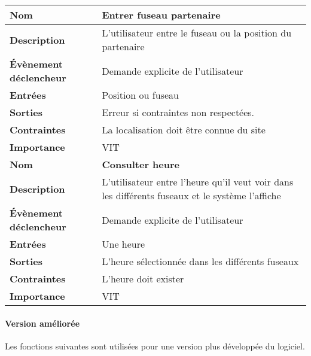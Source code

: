 \documentclass[majeure,gl]{tb}
\begin{document}
 \begin{table}[ht]
  \centering
  \begin{tabular}[c]{|p{3cm}|p{13cm}|}

\hline
 \textbf{Nom} &
 \textbf{Entrer fuseau partenaire}
 \\\hline
 \textbf{Description} &
 L'utilisateur entre le fuseau ou la position du partenaire
 \\\hline
 \textbf{Évènement déclencheur} &
 Demande explicite de l'utilisateur
 \\\hline
 
 \textbf{Entrées} &
 Position ou fuseau
 \\\hline
 \textbf{Sorties} &
 Erreur si contraintes non respectées.
 \\\hline
 \textbf{Contraintes} &
 La localisation doit être connue du site
 \\\hline
 \textbf{Importance} &
 VIT
 \\\hline 
 
 \hline
 \textbf{Nom} &
 \textbf{Consulter heure}
 \\\hline
 \textbf{Description} &
 L'utilisateur entre l'heure qu'il veut voir dans les différents fuseaux et le système l'affiche
 \\\hline
 \textbf{Évènement déclencheur} &
 Demande explicite de l'utilisateur
 \\\hline
 
 \textbf{Entrées} &
 Une heure
 \\\hline
 \textbf{Sorties} &
 L'heure sélectionnée dans les différents fuseaux
 \\\hline
 \textbf{Contraintes} &
 L'heure doit exister
 \\\hline
 \textbf{Importance} &
 VIT
 \\\hline 

    
          \end{tabular}
\end{table}


\clearpage

\paragraph{Version améliorée} Les fonctions suivantes sont utilisées pour une version plus développée du logiciel.
\end{document}
